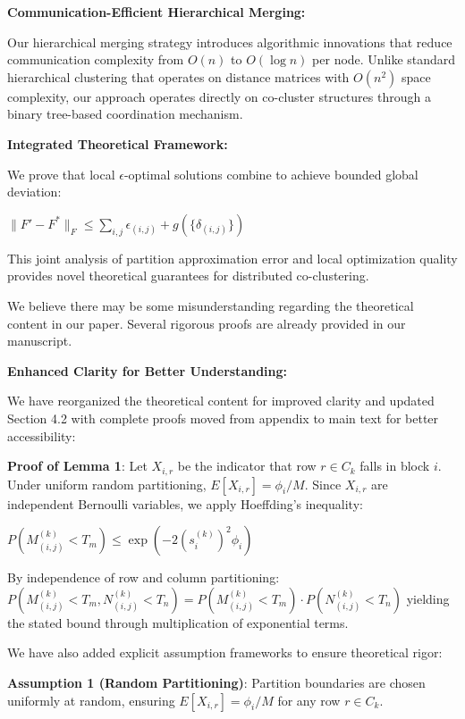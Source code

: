 \documentclass{ar2rc}
\begin{document}
\textbf{Communication-Efficient Hierarchical Merging:}

Our hierarchical merging strategy introduces algorithmic innovations that reduce communication complexity from $O(n)$ to $O(\log n)$ per node. Unlike standard hierarchical clustering that operates on distance matrices with $O(n^2)$ space complexity, our approach operates directly on co-cluster structures through a binary tree-based coordination mechanism.

\textbf{Integrated Theoretical Framework:}

We prove that local $\epsilon$-optimal solutions combine to achieve bounded global deviation:

$\|F' - F^*\|_F \leq \sum_{i,j} \epsilon_{(i,j)} + g(\{\delta_{(i,j)}\})$

This joint analysis of partition approximation error and local optimization quality provides novel theoretical guarantees for distributed co-clustering.


\AR We believe there may be some misunderstanding regarding the theoretical content in our paper. Several rigorous proofs are already provided in our manuscript.

\textbf{Enhanced Clarity for Better Understanding:}

We have reorganized the theoretical content for improved clarity and updated Section 4.2 with complete proofs moved from appendix to main text for better accessibility:

\textbf{Proof of Lemma 1}: Let $X_{i,r}$ be the indicator that row $r \in C_k$ falls in block $i$. Under uniform random partitioning, $E[X_{i,r}] = \phi_i/M$. Since $X_{i,r}$ are independent Bernoulli variables, we apply Hoeffding's inequality:

$P(M_{(i,j)}^{(k)} < T_m) \leq \exp\left(-2(s_i^{(k)})^2 \phi_i\right)$

By independence of row and column partitioning:
$P(M_{(i,j)}^{(k)} < T_m, N_{(i,j)}^{(k)} < T_n) = P(M_{(i,j)}^{(k)} < T_m) \cdot P(N_{(i,j)}^{(k)} < T_n)$
yielding the stated bound through multiplication of exponential terms.

We have also added explicit assumption frameworks to ensure theoretical rigor:

\textbf{Assumption 1 (Random Partitioning)}: Partition boundaries are chosen uniformly at random, ensuring $E[X_{i,r}] = \phi_i/M$ for any row $r \in C_k$.
\end{document}
